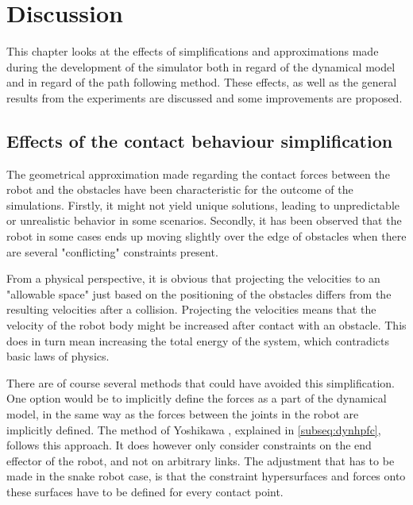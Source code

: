 \chapter{Discussion} \label{ch:discussion}

This chapter looks at the effects of simplifications and approximations made during the development of the simulator both in regard of the dynamical model and in regard of the path following method. These effects, as well as the general results from the experiments are discussed and some improvements are proposed.

\section{Effects of the contact behaviour simplification}

The geometrical approximation made regarding the contact forces between the robot and the obstacles have been characteristic for the outcome of the simulations. Firstly, it might not yield unique solutions, leading to unpredictable or unrealistic behavior in some scenarios. Secondly, it has been observed that the robot in some cases ends up moving slightly over the edge of obstacles when there are several "conflicting" constraints present.

From a physical perspective, it is obvious that projecting the velocities to an "allowable space" just based on the positioning of the obstacles differs from the resulting velocities after a collision. Projecting the velocities means that the velocity of the robot body might be increased after contact with an obstacle. This does in turn mean increasing the total energy of the system, which contradicts basic laws of physics.  

There are of course several methods that could have avoided this simplification.
One option would be to implicitly define the forces as a part of the dynamical model, in the same way as the forces between the joints in the robot are implicitly defined. The method of Yoshikawa \cite{yoshikawa1987dynamic}, explained in \ref{subseq:dynhpfc}, follows this approach. It does however only consider constraints on the end effector of the robot, and not on arbitrary links. The adjustment that has to be made in the snake robot case, is that the constraint hypersurfaces and forces onto these surfaces have to be defined for every contact point.


